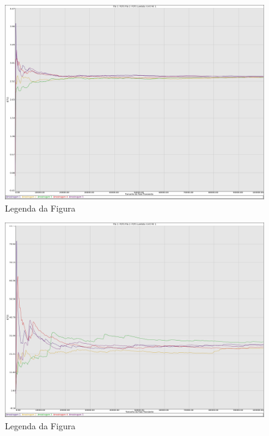 \documentclass[a4paper,10pt]{article}
\begin{document}
\begin{figure}
	\caption{Legenda da Figura}
	\label{figTransienteFCFSfila1T}
	\includegraphics[scale = 0.2]{./graficos_transiente_1/FCFS/05.png}
\end{figure}

\begin{figure}
	\caption{Legenda da Figura}
	\label{figTransienteFCFSfila2T}
	\includegraphics[scale = 0.2]{./graficos_transiente_1/FCFS/06.png}
\end{figure}
\end{document}
